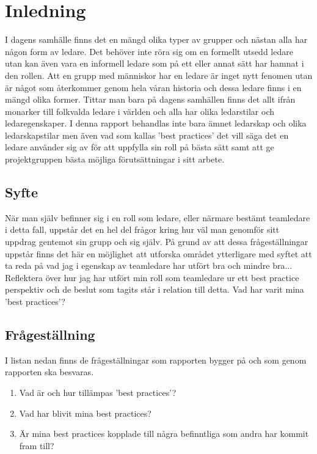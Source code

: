 \section{Inledning}
I dagens samhälle finns det en mängd olika typer av grupper och nästan alla har någon form av ledare. Det behöver inte röra sig om en formellt utsedd ledare utan kan även vara en informell ledare som på ett eller annat sätt har hamnat i den rollen. Att en grupp med människor har en ledare är inget nytt fenomen utan är något som återkommer genom hela våran historia och dessa ledare finns i en mängd olika former. Tittar man bara på dagens samhällen finns det allt ifrån monarker till folkvalda ledare i världen och alla har olika ledarstilar och ledaregenskaper. I denna rapport behandlas inte bara ämnet ledarskap och olika ledarskapstilar men även vad som kallas 'best practices' det vill säga det en ledare använder sig av för att uppfylla sin roll på bästa sätt samt att ge projektgruppen bästa möjliga förutsättningar i sitt arbete. 

\subsection{Syfte}
När man själv befinner sig i en roll som ledare, eller närmare bestämt teamledare i detta fall, uppstår det en hel del frågor kring hur väl man genomför sitt uppdrag gentemot sin grupp och sig själv. På grund av att dessa frågeställningar uppstår finns det här en möjlighet att utforska området ytterligare med syftet att ta reda på vad jag i egenskap av teamledare har utfört bra och mindre bra...
\newline \newline
Reflektera över hur jag har utfört min roll som teamledare ur ett best practice perspektiv och de beslut som tagits står i relation till detta. Vad har varit mina 'best practices'?

\subsection{Frågeställning}
I listan nedan finns de frågeställningar som rapporten bygger på och som genom rapporten ska besvaras.
	\begin{enumerate}
		\item Vad är och hur tillämpas 'best practices'?
		\item Vad har blivit mina best practices?
		\item Är mina best practices kopplade till några befinntliga som andra har kommit fram till?
	\end{enumerate}

